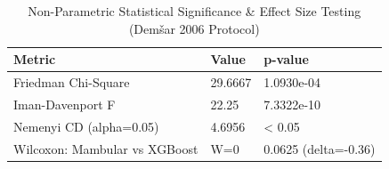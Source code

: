 \begin{table}[t]
\centering
\caption{Non-Parametric Statistical Significance & Effect Size Testing (Demšar 2006 Protocol)}
\label{tab:statistical_validation}
\small
\begin{tabular}{lll}
\toprule
Metric & Value & p-value \\
\midrule
Friedman Chi-Square & 29.6667 & 1.0930e-04 \\
Iman-Davenport F & 22.25 & 7.3322e-10 \\
Nemenyi CD (alpha=0.05) & 4.6956 & < 0.05 \\
Wilcoxon: Mambular vs XGBoost & W=0 & 0.0625 (delta=-0.36) \\
\bottomrule
\end{tabular}

\end{table}
